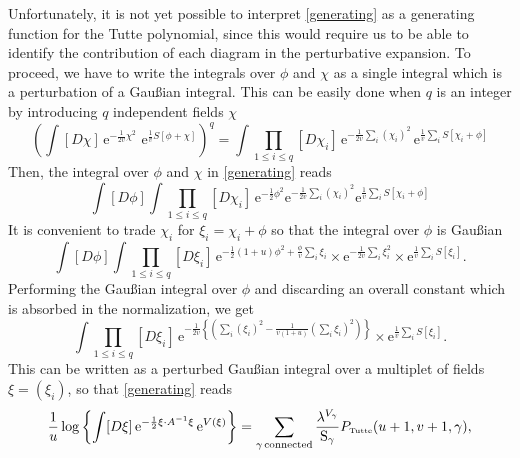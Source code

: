 \documentclass[10pt,here,feynmf]{article}
\begin{document}
Unfortunately, it is not yet possible to interpret \eqref{generating} as a generating function for the Tutte polynomial, since this would require us to be able to identify the contribution of each diagram in the  perturbative expansion. To proceed, we have to write the integrals over $\phi$ and $\chi$ as a single integral which is a perturbation of a Gau\ss ian integral.   This can be easily done when $q$ is an integer by introducing $q$ independent fields $\chi$ 
\begin{equation}
\left(
\int[D\chi]\,\mathrm{e}^{-\frac{1}{2v}\chi^{2}}\,
\,\mathrm{e}^{\frac{1}{v}S[\phi+\chi]}
\right)^{q}
=\int \prod_{1\leq i\leq q}[D\chi_{i}]\,
\mathrm{e}^{-\frac{1}{2v}\sum_{i}(\chi_{i})^{2}}\,\mathrm{e}^{\frac{1}{v}\sum_{i}S[\chi_{i}+\phi]}
\end{equation}
Then, the integral over $\phi$ and $\chi$ in \eqref{generating} reads
\begin{equation}
\int[D\phi]\int \prod_{1\leq i\leq q}[D\chi_{i}]\,
\mathrm{e}^{-\frac{1}{2}\phi^{2}}
\mathrm{e}^{-\frac{1}{2v}\sum_{i}(\chi_{i})^{2}}\mathrm{e}^{\frac{1}{v}\sum_{i}S[\chi_{i}+\phi]}
\end{equation}
It is convenient to trade $\chi_{i}$ for $\xi_{i}=\chi_{i}+\phi$ so that the integral over $\phi$ is Gau\ss ian 
\begin{equation}
\int [D\phi]\int \prod_{1\leq i\leq q}[D\xi_{i}]\,
\mathrm{e}^{-\frac{1}{2}\left(1+u\right)\phi^{2}
+\frac{\phi}{v}\sum_{i}\xi_{i}}
\times\mathrm{e}^{-\frac{1}{2v}\sum_{i}\xi_{i}^{2}}
\times\mathrm{e}^{\frac{1}{v}\sum_{i}S[\xi_{i}]}.
 \end{equation}
Performing the Gau\ss ian integral over $\phi$  and discarding an overall constant which is absorbed in the normalization, we get
\begin{equation}
\int \prod_{1\leq i\leq q}[D\xi_{i}]\,
\mathrm{e}^{-\frac{1}{2v}\left\{
\left(\sum_{i}(\xi_{i})^{2}-\frac{1}{v(1+u)}\left(\sum_{i}\xi_{i}\right)^{2}\right)\right\}}
\times\mathrm{e}^{\frac{1}{v}\sum_{i}S[\xi_{i}]}.
 \end{equation}
This can be written as a perturbed Gau\ss ian integral over a multiplet of fields $\xi=(\xi_{i})$, so that \eqref{generating} reads
\begin{equation}
\frac{1}{u}\log\left\{
\int  [D\xi]\,
\mathrm{e}^{
-\frac{1}{2}\xi\cdot A^{-1}\xi}\, \mathrm{e}^{V(\xi)}
\right\}=
\sum_{\gamma\,\mathrm{connected}}
\frac{\lambda^{V_{\gamma}}}{\mathrm{S}_{\gamma}}P_{\mbox{\tiny Tutte}}(u+1,v+1,\gamma),
\label{generating2}
\end{equation}
\end{document}
